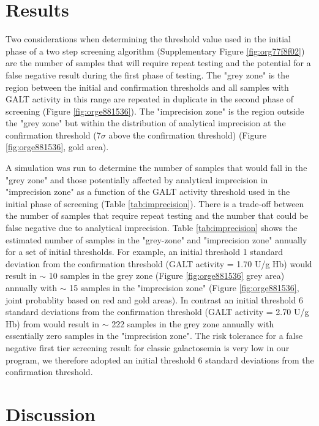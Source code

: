 \documentclass[review]{elsarticle}
\begin{document}
\section*{Results}
\label{sec:org6d98946}

Two considerations when determining the threshold value used in the
initial phase of a two step screening algorithm (Supplementary Figure
\ref{fig:org77f8f02}) are the number of samples that will require repeat
testing and the potential for a false negative result during the first
phase of testing.  The "grey zone" is the region between the initial
and confirmation thresholds and all samples with GALT activity in this
range are repeated in duplicate in the second phase of screening
(Figure \ref{fig:orge881536}). The "imprecision zone" is the region outside
the "grey zone" but within the distribution of analytical imprecision
at the confirmation threshold (7\(\sigma\) above the confirmation
threshold) (Figure \ref{fig:orge881536}, gold area). 

A simulation was run to determine the number of samples that would
fall in the "grey zone" and those potentially affected by analytical
imprecision in "imprecision zone" as a function of the GALT activity
threshold used in the initial phase of screening (Table
\ref{tab:imprecision}). There is a trade-off between the number of
samples that require repeat testing and the number that could be false
negative due to analytical imprecision. Table \ref{tab:imprecision}
shows the estimated number of samples in the "grey-zone" and
"imprecision zone" annually for a set of initial thresholds. For
example, an initial threshold 1 standard deviation from the
confirmation threshold (GALT activity = 1.70 U/g Hb) would result in
\(\sim\) 10 samples in the grey zone (Figure \ref{fig:orge881536} grey area)
annually with \(\sim\) 15 samples in the "imprecision zone" (Figure
\ref{fig:orge881536}, joint probablity based on red and gold areas). In
contrast an initial threshold 6 standard deviations from the
confirmation threshold (GALT activity = 2.70 U/g Hb) from would result
in \(\sim\) 222 samples in the grey zone annually with essentially zero
samples in the "imprecision zone". The risk tolerance for a false
negative first tier screening result for classic galactosemia is very
low in our program, we therefore adopted an initial threshold 6
standard deviations from the confirmation threshold.

\section*{Discussion}
\label{sec:org4076e2c}
\end{document}

